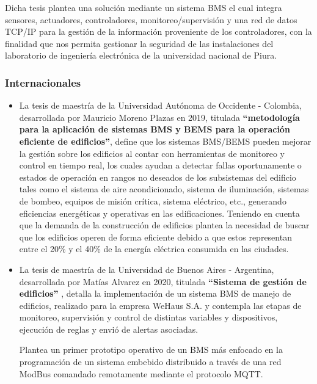 \documentclass[a4paper, 12pt]{article}
\begin{document}
\begin{itemize}
Dicha tesis plantea una solución mediante un sistema BMS el cual integra sensores, actuadores, controladores, monitoreo/supervisión y una red de datos TCP/IP para la gestión de la información proveniente de los controladores, con la finalidad que nos permita gestionar la seguridad de las instalaciones del laboratorio de ingeniería electrónica de la universidad nacional de Piura.
 

\end{itemize}
\subsubsection{Internacionales}

\begin{itemize}
\item La tesis de maestría de la Universidad Autónoma de Occidente - Colombia, desarrollada por Mauricio Moreno Plazas en 2019, titulada \textbf{“metodología para la aplicación de sistemas BMS y BEMS para la operación eficiente de edificios”}\citep{TESIS03}, define que los sistemas BMS/BEMS pueden mejorar la gestión sobre los edificios al contar con herramientas de monitoreo y control en tiempo real, los cuales ayudan a detectar fallas oportunamente o estados de operación en rangos no deseados de los subsistemas del edificio tales como el sistema de aire acondicionado, sistema de iluminación, sistemas de bombeo, equipos de misión crítica, sistema eléctrico, etc., generando eficiencias energéticas y operativas en las edificaciones. Teniendo en cuenta que la demanda de la construcción de edificios plantea la necesidad de buscar que los edificios operen de forma eficiente debido a que estos representan entre el 20\% y el 40\% de la energía eléctrica consumida en las ciudades.

\item La tesis de maestría de la Universidad de Buenos Aires - Argentina, desarrollada por Matías Alvarez en 2020, titulada \textbf{“Sistema de gestión de edificios”} \citep{TESIS04}, detalla la implementación de un sistema BMS de manejo de edificios, realizado para la empresa WeHaus S.A. y contempla las etapas de monitoreo, supervisión y control de distintas variables y dispositivos, ejecución de reglas y envió de alertas asociadas.

Plantea un primer prototipo operativo de un BMS más enfocado en la programación de un sistema embebido distribuido a través de una red ModBus comandado remotamente mediante el protocolo MQTT.



\end{itemize}
\end{document}
